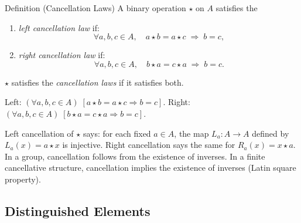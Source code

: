 \begin{definitionbox}{Definition (Cancellation Laws)}
\label{def:cancellation}
A binary operation $\star$ on $A$ satisfies the
\begin{enumerate}[label=(\roman*)]
  \item \emph{left cancellation law} if:
        \[
          \forall a, b, c \in A,\quad
          a \star b = a \star c \;\Rightarrow\; b = c,
        \]
  \item \emph{right cancellation law} if:
        \[
          \forall a, b, c \in A,\quad
          b \star a = c \star a \;\Rightarrow\; b = c.
        \]
\end{enumerate}
$\star$ satisfies the \emph{cancellation laws} if it satisfies both.
\end{definitionbox}

\begin{remark}
Left: $(\forall a,b,c \in A)\;[a \star b = a \star c \Rightarrow b = c]$.
Right: $(\forall a,b,c \in A)\;[b \star a = c \star a \Rightarrow b = c]$.
\end{remark}

\begin{remark}
Left cancellation of $\star$ says: for each fixed $a \in A$, the map
$L_a : A \to A$ defined by $L_a(x) = a \star x$ is injective.
Right cancellation says the same for $R_a(x) = x \star a$.
In a group, cancellation follows from the existence of inverses.
In a finite cancellative structure, cancellation implies the existence of
inverses (Latin square property).
\end{remark}


\subsection*{Distinguished Elements}

